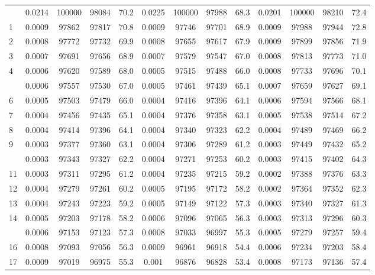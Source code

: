 \documentclass[
  14pt,
]{article}
\begin{document}
\begin{longtable}[t]{lcccccccccccc}
\endfoot
\bottomrule
\endlastfoot
0 & 0.0214 & 100000 & 98084 & 70.2 & 0.0225 & 100000 & 97988 & 68.3 & 0.0201 & 100000 & 98210 & 72.4\\
1 & 0.0009 & 97862 & 97817 & 70.8 & 0.0009 & 97746 & 97701 & 68.9 & 0.0009 & 97988 & 97944 & 72.8\\
2 & 0.0008 & 97772 & 97732 & 69.9 & 0.0008 & 97655 & 97617 & 67.9 & 0.0009 & 97899 & 97856 & 71.9\\
3 & 0.0007 & 97691 & 97656 & 68.9 & 0.0007 & 97579 & 97547 & 67.0 & 0.0008 & 97813 & 97773 & 71.0\\
4 & 0.0006 & 97620 & 97589 & 68.0 & 0.0005 & 97515 & 97488 & 66.0 & 0.0008 & 97733 & 97696 & 70.1\\
\addlinespace
5 & 0.0006 & 97557 & 97530 & 67.0 & 0.0005 & 97461 & 97439 & 65.1 & 0.0007 & 97659 & 97627 & 69.1\\
6 & 0.0005 & 97503 & 97479 & 66.0 & 0.0004 & 97416 & 97396 & 64.1 & 0.0006 & 97594 & 97566 & 68.1\\
7 & 0.0004 & 97456 & 97435 & 65.1 & 0.0004 & 97376 & 97358 & 63.1 & 0.0005 & 97538 & 97514 & 67.2\\
8 & 0.0004 & 97414 & 97396 & 64.1 & 0.0004 & 97340 & 97323 & 62.2 & 0.0004 & 97489 & 97469 & 66.2\\
9 & 0.0003 & 97377 & 97360 & 63.1 & 0.0004 & 97306 & 97289 & 61.2 & 0.0003 & 97449 & 97432 & 65.2\\
\addlinespace
10 & 0.0003 & 97343 & 97327 & 62.2 & 0.0004 & 97271 & 97253 & 60.2 & 0.0003 & 97415 & 97402 & 64.3\\
11 & 0.0003 & 97311 & 97295 & 61.2 & 0.0004 & 97235 & 97215 & 59.2 & 0.0002 & 97388 & 97376 & 63.3\\
12 & 0.0004 & 97279 & 97261 & 60.2 & 0.0005 & 97195 & 97172 & 58.2 & 0.0002 & 97364 & 97352 & 62.3\\
13 & 0.0004 & 97243 & 97223 & 59.2 & 0.0005 & 97149 & 97122 & 57.3 & 0.0003 & 97340 & 97327 & 61.3\\
14 & 0.0005 & 97203 & 97178 & 58.2 & 0.0006 & 97096 & 97065 & 56.3 & 0.0003 & 97313 & 97296 & 60.3\\
\addlinespace
15 & 0.0006 & 97153 & 97123 & 57.3 & 0.0008 & 97033 & 96997 & 55.3 & 0.0005 & 97279 & 97257 & 59.4\\
16 & 0.0008 & 97093 & 97056 & 56.3 & 0.0009 & 96961 & 96918 & 54.4 & 0.0006 & 97234 & 97203 & 58.4\\
17 & 0.0009 & 97019 & 96975 & 55.3 & 0.001 & 96876 & 96828 & 53.4 & 0.0008 & 97173 & 97136 & 57.4\\

\end{longtable}
\end{document}
